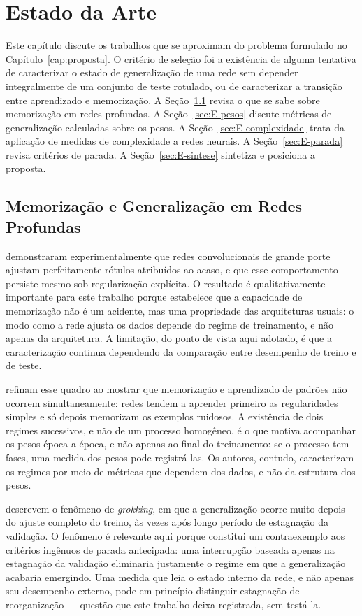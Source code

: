 \chapter{Estado da Arte}
\label{cap:estado-arte}

Este capítulo discute os trabalhos que se aproximam do problema formulado no
Capítulo~\ref{cap:proposta}. O critério de seleção foi a existência de alguma
tentativa de caracterizar o estado de generalização de uma rede sem depender
integralmente de um conjunto de teste rotulado, ou de caracterizar a transição
entre aprendizado e memorização. A Seção~\ref{sec:E-memorizacao} revisa o que se
sabe sobre memorização em redes profundas. A Seção~\ref{sec:E-pesos} discute
métricas de generalização calculadas sobre os pesos. A
Seção~\ref{sec:E-complexidade} trata da aplicação de medidas de complexidade a
redes neurais. A Seção~\ref{sec:E-parada} revisa critérios de parada. A
Seção~\ref{sec:E-sintese} sintetiza e posiciona a proposta.

\section{Memorização e Generalização em Redes Profundas}
\label{sec:E-memorizacao}

 demonstraram experimentalmente que redes convolucionais
de grande porte ajustam perfeitamente rótulos atribuídos ao acaso, e que esse
comportamento persiste mesmo sob regularização explícita. O resultado é
qualitativamente importante para este trabalho porque estabelece que a
capacidade de memorização não é um acidente, mas uma propriedade das
arquiteturas usuais: o modo como a rede ajusta os dados depende do regime de
treinamento, e não apenas da arquitetura. A limitação, do ponto de vista aqui
adotado, é que a caracterização continua dependendo da comparação entre
desempenho de treino e de teste.

 refinam esse quadro ao mostrar que memorização e
aprendizado de padrões não ocorrem simultaneamente: redes tendem a aprender
primeiro as regularidades simples e só depois memorizam os exemplos ruidosos.
A existência de dois regimes sucessivos, e não de um processo homogêneo, é o
que motiva acompanhar os pesos época a época, e não apenas ao final do
treinamento: se o processo tem fases, uma medida dos pesos pode registrá-las.
Os autores, contudo, caracterizam os
regimes por meio de métricas que dependem dos dados, e não da estrutura dos
pesos.

 descrevem o fenômeno de \emph{grokking}, em que a
generalização ocorre muito depois do ajuste completo do treino, às vezes após
longo período de estagnação da validação. O fenômeno é relevante aqui porque
constitui um contraexemplo aos critérios ingênuos de parada antecipada: uma
interrupção baseada apenas na estagnação da validação eliminaria justamente o
regime em que a generalização acabaria emergindo. Uma medida que leia o
estado interno da rede, e não apenas seu desempenho externo, pode em princípio
distinguir estagnação de reorganização --- questão que este trabalho deixa
registrada, sem testá-la.

